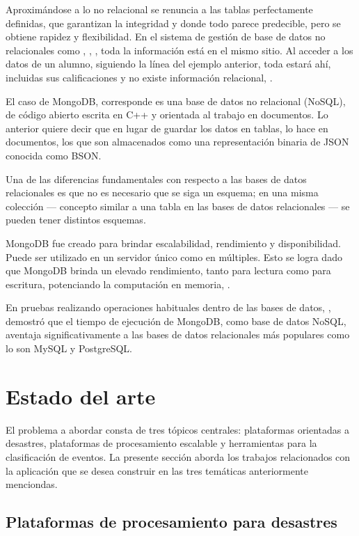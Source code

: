 Aproximándose a lo no relacional se renuncia a las tablas perfectamente definidas, que garantizan la integridad y donde todo parece predecible, pero se obtiene rapidez y flexibilidad. En el sistema de gestión de base de datos no relacionales como \citep{CassandraNOSQL}, \citep{redisNOSQL}, \citep{MongoDB}, toda la información está en el mismo sitio. Al acceder a los datos de un alumno, siguiendo la línea del ejemplo anterior, toda estará ahí, incluidas sus calificaciones y no existe información relacional, \citep{BDNOSQL}.

El caso de MongoDB, corresponde es una base de datos no relacional (NoSQL), de código abierto escrita en C++ y orientada al trabajo en documentos. Lo anterior quiere decir que en lugar de guardar los datos en tablas, lo hace en documentos, los que son almacenados como una representación binaria de JSON conocida como BSON.

Una de las diferencias fundamentales con respecto a las bases de datos relacionales es que no es necesario que se siga un esquema; en una misma colección — concepto similar a una tabla en las bases de datos relacionales — se pueden tener distintos esquemas.

MongoDB fue creado para brindar escalabilidad, rendimiento y disponibilidad. Puede ser utilizado en un servidor único como en múltiples. Esto se logra dado que MongoDB brinda un elevado rendimiento, tanto para lectura como para escritura, potenciando la computación en memoria, \citep{MongoDB}.

En pruebas realizando operaciones habituales dentro de las bases de datos, \citep{MongoPerformance}, demostró que el tiempo de ejecución de MongoDB, como base de datos NoSQL, aventaja significativamente a las bases de datos relacionales más populares como lo son MySQL y PostgreSQL.

\section{Estado del arte}
\label{intro:motivacion:arte}

El problema a abordar consta de tres tópicos centrales: plataformas orientadas a desastres, plataformas de procesamiento escalable y herramientas para la clasificación de eventos. La presente sección aborda los trabajos relacionados con la aplicación que se desea construir en las tres temáticas anteriormente menciondas.

\subsection{Plataformas de procesamiento para desastres}
\label{arte:PPDesastres}

